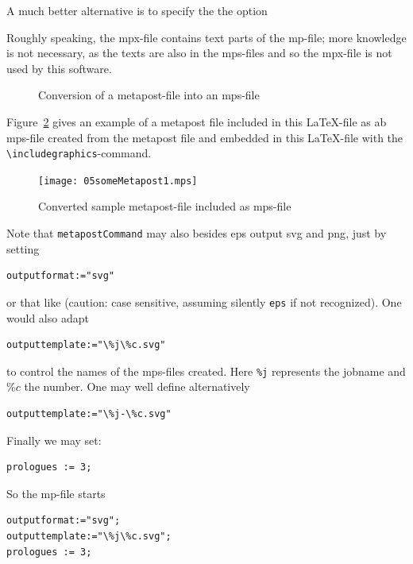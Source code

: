 \documentclass[12pt]{article}
\begin{document}
A much better alternative is to specify the the option 


Roughly speaking, the mpx-file contains text parts of the mp-file; 
more knowledge is not necessary, as the texts are also in the mps-files 
and so the mpx-file is not used by this software. 

\begin{figure}[htb]
\begin{center}

\end{center}
\caption{\label{fig:mp2mps}Conversion of a metapost-file into an mps-file}
\end{figure}


Figure~\ref{fig:metapost} gives an example of a metapost file 
included in this \LaTeX-file as ab mps-file 
created from the metapost file 
and embedded in this \LaTeX-file 
with the {\tt\textbackslash includegraphics}-command. 

\begin{figure}[htb]
\begin{center}
\texttt{[image: 05someMetapost1.mps]}
\end{center}
\caption{\label{fig:metapost}
Converted sample metapost-file included as mps-file  }
\end{figure}

Note that {\tt metapostCommand} may also besides \gls{eps} 
output \gls{svg} and \gls{png}, 
just by setting 
%
\begin{verbatim}
outputformat:="svg" 
\end{verbatim}
%
or that like 
(caution: case sensitive, assuming silently {\tt eps} if not recognized). 
One would also adapt 
%
\begin{verbatim}
outputtemplate:="\%j\%c.svg"
\end{verbatim}
%
to control the names of the mps-files created. 
Here {\tt\%j} represents the jobname and $\%c$ the number. 
One may well define alternatively 
%
\begin{verbatim}
outputtemplate:="\%j-\%c.svg"
\end{verbatim}

Finally we may set: 
%
\begin{verbatim}
prologues := 3;
\end{verbatim}

So the mp-file starts 
%
\lstset{language=metapost, basicstyle=\normalsize}
\begin{lstlisting}
outputformat:="svg";
outputtemplate:="\%j\%c.svg";
prologues := 3;
\end{lstlisting}
\end{document}
